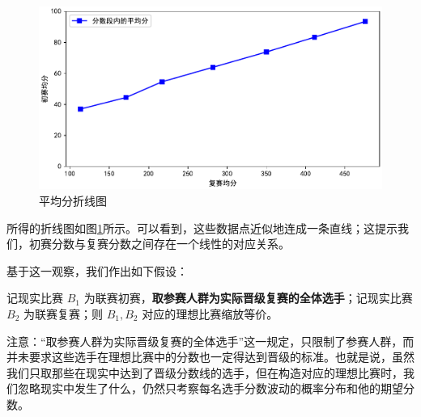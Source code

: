             \begin{figure}
                \centering
                \includegraphics[width=\textwidth]{fig/plottingAvgScores.pdf}
                \caption{平均分折线图}
                \label{fig:plottingAvgScores}
            \end{figure}

            所得的折线图如图\ref{fig:plottingAvgScores}所示。可以看到，这些数据点近似地连成一条直线；这提示我们，初赛分数与复赛分数之间存在一个线性的对应关系。
            
            基于这一观察，我们作出如下假设：

            \begin{assumption}
                记现实比赛 $B_1$ 为联赛初赛，\textbf{取参赛人群为实际晋级复赛的全体选手}；记现实比赛 $B_2$ 为联赛复赛；则 $B_1,B_2$ 对应的理想比赛缩放等价。

                \label{ass:equivalenceBetweenTwoRounds}
            \end{assumption}

            注意：“取参赛人群为实际晋级复赛的全体选手”这一规定，只限制了参赛人群，而并未要求这些选手在理想比赛中的分数也一定得达到晋级的标准。也就是说，虽然我们只取那些在现实中达到了晋级分数线的选手，但在构造对应的理想比赛时，我们忽略现实中发生了什么，仍然只考察每名选手分数波动的概率分布和他的期望分数。

            \vspace{1.5ex}

